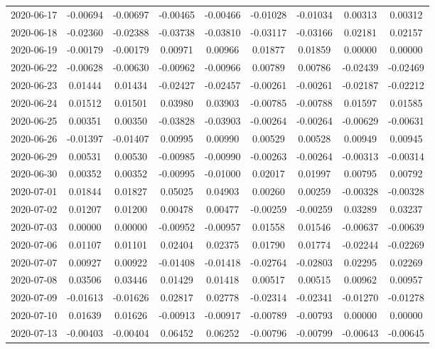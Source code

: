 \begin{footnotesize}
\begin{longtable}{lcccccccc}
2020-06-17 & -0.00694 & -0.00697 & -0.00465 & -0.00466 & -0.01028 & -0.01034 & 0.00313 & 0.00312 \\
2020-06-18 & -0.02360 & -0.02388 & -0.03738 & -0.03810 & -0.03117 & -0.03166 & 0.02181 & 0.02157 \\
2020-06-19 & -0.00179 & -0.00179 & 0.00971 & 0.00966 & 0.01877 & 0.01859 & 0.00000 & 0.00000 \\
2020-06-22 & -0.00628 & -0.00630 & -0.00962 & -0.00966 & 0.00789 & 0.00786 & -0.02439 & -0.02469 \\
2020-06-23 & 0.01444 & 0.01434 & -0.02427 & -0.02457 & -0.00261 & -0.00261 & -0.02187 & -0.02212 \\
2020-06-24 & 0.01512 & 0.01501 & 0.03980 & 0.03903 & -0.00785 & -0.00788 & 0.01597 & 0.01585 \\
2020-06-25 & 0.00351 & 0.00350 & -0.03828 & -0.03903 & -0.00264 & -0.00264 & -0.00629 & -0.00631 \\
2020-06-26 & -0.01397 & -0.01407 & 0.00995 & 0.00990 & 0.00529 & 0.00528 & 0.00949 & 0.00945 \\
2020-06-29 & 0.00531 & 0.00530 & -0.00985 & -0.00990 & -0.00263 & -0.00264 & -0.00313 & -0.00314 \\
2020-06-30 & 0.00352 & 0.00352 & -0.00995 & -0.01000 & 0.02017 & 0.01997 & 0.00795 & 0.00792 \\
2020-07-01 & 0.01844 & 0.01827 & 0.05025 & 0.04903 & 0.00260 & 0.00259 & -0.00328 & -0.00328 \\
2020-07-02 & 0.01207 & 0.01200 & 0.00478 & 0.00477 & -0.00259 & -0.00259 & 0.03289 & 0.03237 \\
2020-07-03 & 0.00000 & 0.00000 & -0.00952 & -0.00957 & 0.01558 & 0.01546 & -0.00637 & -0.00639 \\
2020-07-06 & 0.01107 & 0.01101 & 0.02404 & 0.02375 & 0.01790 & 0.01774 & -0.02244 & -0.02269 \\
2020-07-07 & 0.00927 & 0.00922 & -0.01408 & -0.01418 & -0.02764 & -0.02803 & 0.02295 & 0.02269 \\
2020-07-08 & 0.03506 & 0.03446 & 0.01429 & 0.01418 & 0.00517 & 0.00515 & 0.00962 & 0.00957 \\
2020-07-09 & -0.01613 & -0.01626 & 0.02817 & 0.02778 & -0.02314 & -0.02341 & -0.01270 & -0.01278 \\
2020-07-10 & 0.01639 & 0.01626 & -0.00913 & -0.00917 & -0.00789 & -0.00793 & 0.00000 & 0.00000 \\
2020-07-13 & -0.00403 & -0.00404 & 0.06452 & 0.06252 & -0.00796 & -0.00799 & -0.00643 & -0.00645 \\

\end{longtable}
\end{footnotesize}
